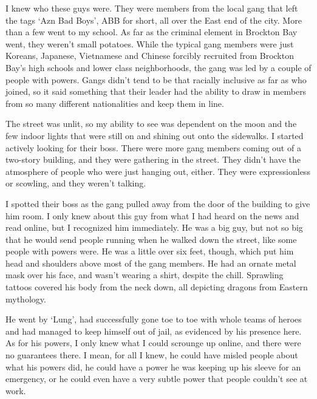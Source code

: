 I knew who these guys were.  They were members from the local gang that left the tags `Azn Bad Boys', ABB for short, all over the East end of the city.  More than a few went to my school.  As far as the criminal element in Brockton Bay went, they weren't small potatoes.  While the typical gang members were just Koreans, Japanese, Vietnamese and Chinese forcibly recruited from Brockton Bay's high schools and lower class neighborhoods, the gang was led by a couple of people with powers.  Gangs didn't tend to be that racially inclusive as far as who joined, so it said something that their leader had the ability to draw in members from so many different nationalities and keep them in line.



The street was unlit, so my ability to see was dependent on the moon and the few indoor lights that were still on and shining out onto the sidewalks. I started actively looking for their boss.  There were more gang members coming out of a two-story building, and they were gathering in the street.  They didn't have the atmosphere of people who were just hanging out, either.  They were expressionless or scowling, and they weren't talking.



I spotted their boss as the gang pulled away from the door of the building to give him room.  I only knew about this guy from what I had heard on the news and read online, but I recognized him immediately.  He was a big guy, but not so big that he would send people running when he walked down the street, like some people with powers were.  He was a little over six feet, though, which put him head and shoulders above most of the gang members.  He had an ornate metal mask over his face, and wasn't wearing a shirt, despite the chill.  Sprawling tattoos covered his body from the neck down, all depicting dragons from Eastern mythology.



He went by `Lung', had successfully gone toe to toe with whole teams of heroes and had managed to keep himself out of jail, as evidenced by his presence here.  As for his powers, I only knew what I could scrounge up online, and there were no guarantees there.  I mean, for all I knew, he could have misled people about what his powers did, he could have a power he was keeping up his sleeve for an emergency, or he could even have a very subtle power that people couldn't see at work.



